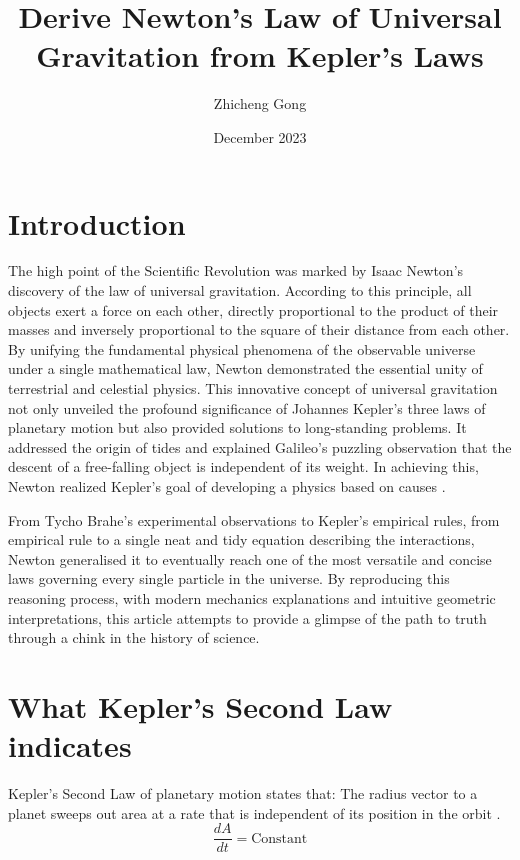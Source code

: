 \documentclass{article}
\title{Derive Newton's Law of Universal Gravitation from Kepler's Laws}
\author{Zhicheng Gong}
\date{December 2023}
\begin{document}
\maketitle


\section{Introduction}

The high point of the Scientific Revolution was marked by Isaac Newton's discovery of the law of universal gravitation. According to this principle, all objects exert a force on each other, directly proportional to the product of their masses and inversely proportional to the square of their distance from each other. By unifying the fundamental physical phenomena of the observable universe under a single mathematical law, Newton demonstrated the essential unity of terrestrial and celestial physics. This innovative concept of universal gravitation not only unveiled the profound significance of Johannes Kepler's three laws of planetary motion but also provided solutions to long-standing problems. It addressed the origin of tides and explained Galileo's puzzling observation that the descent of a free-falling object is independent of its weight. In achieving this, Newton realized  Kepler's goal of developing a physics based on causes \autocite{Cohen1981}.

From Tycho Brahe's experimental observations to Kepler's empirical rules, from empirical rule to a single neat and tidy equation describing the interactions, Newton generalised it to eventually reach one of the most versatile and concise laws governing every single particle in the universe. By reproducing this reasoning process, with modern mechanics explanations and intuitive geometric interpretations, this article attempts to provide a glimpse of the path to truth through a chink in the history of science.

\section{What Kepler's Second Law indicates}

Kepler's Second Law of planetary motion states that:
The radius vector to a planet sweeps out area at a rate that is independent of its position in the orbit \autocite{Morin2008}.
\[\frac{dA}{dt} = \text{Constant}\]
\end{document}
